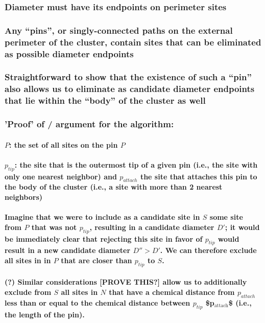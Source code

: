 \documentclass{umthesis}
\begin{document}
\subsubsection{Diameter must have its endpoints on perimeter sites}
\label{sec-3.2.4.2}
\subsubsection{Any ``pins'', or singly-connected paths on the external perimeter of the cluster, contain sites that can be eliminated as possible diameter endpoints}
\label{sec-3.2.4.3}
\subsubsection{Straightforward to show that the existence of such a ``pin'' also allows us to eliminate as candidate diameter endpoints that lie within the ``body'' of the cluster as well}
\label{sec-3.2.4.4}
\subsubsection{'Proof' of / argument for the algorithm:}
\label{sec-3.2.4.5}
\paragraph{$P$: the set of all sites on the pin $P$}
\label{sec-3.2.4.5.1}
\paragraph{$p_{tip}$: the site that is the outermost tip of a given pin (i.e., the site with only one nearest neighbor) and $p_{attach}$ the site that attaches this pin to the body of the cluster (i.e., a site with more than 2 nearest neighbors)}
\label{sec-3.2.4.5.2}
\paragraph{Imagine that we were to include as a candidate site in $S$ some site from $P$ that was not $p_{tip}$, resulting in a candidate diameter $D'$; it would be immediately clear that rejecting this site in favor of $p_{tip}$ would result in a new candidate diameter $D''>D'$.  We can therefore exclude all sites in in $P$ that are closer than $p_{tip}$ to $S$.}
\label{sec-3.2.4.5.3}
\paragraph{(?) Similar considerations [PROVE THIS?] allow us to additionally exclude from $S$ all sites in $N$ that have a chemical distance from $p_{attach}$ less than or equal to the chemical distance between $p_{tip}$ \$p$_{\mathrm{attach}}$\$ (i.e., the length of the pin).}
\label{sec-3.2.4.5.4}
\end{document}
